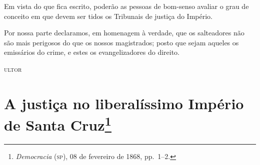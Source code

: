 Em vista do que fica escrito, poderão as pessoas de bom-senso avaliar o
grau de conceito em que devem ser tidos os Tribunais de justiça do
Império.

Por nossa parte declaramos, em homenagem à verdade, que os salteadores
não são mais perigosos do que os nossos magistrados; posto que sejam
aqueles os emissários do crime, e estes os evangelizadores do direito.

\begin{flushright}
\textsc{ultor}
\end{flushright}

\chapter{A justiça no liberalíssimo Império de Santa Cruz\footnote{\emph{Democracia} (\textsc{sp}), 08 de fevereiro de 1868, pp.~1--2.}}

